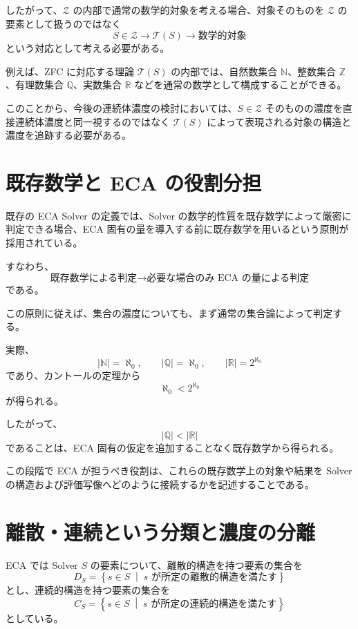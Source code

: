 \documentclass[a4paper,11pt]{article}
\begin{document}
したがって、$\mathcal{Z}$ の内部で通常の数学的対象を考える場合、対象そのものを $\mathcal{Z}$ の要素として扱うのではなく
\[
\boxed{
S\in\mathcal{Z}
\longrightarrow
\mathcal{T}(S)
\longrightarrow
\text{数学的対象}
}
\]
という対応として考える必要がある。

例えば、ZFC に対応する理論 $\mathcal{T}(S)$ の内部では、自然数集合 $\mathbb{N}$、整数集合 $\mathbb{Z}$、有理数集合 $\mathbb{Q}$、実数集合 $\mathbb{R}$ などを通常の数学として構成することができる。

このことから、今後の連続体濃度の検討においては、$S\in\mathcal{Z}$ そのものの濃度を直接連続体濃度と同一視するのではなく $\mathcal{T}(S)$ によって表現される対象の構造と濃度を追跡する必要がある。

\section{既存数学と ECA の役割分担}

既存の ECA Solver の定義では、Solver の数学的性質を既存数学によって厳密に判定できる場合、ECA 固有の量を導入する前に既存数学を用いるという原則が採用されている。

すなわち、
\[
\boxed{
\text{既存数学による判定}
\longrightarrow
\text{必要な場合のみ ECA の量による判定}
}
\]
である。

この原則に従えば、集合の濃度についても、まず通常の集合論によって判定する。

実際、
\[
|\mathbb{N}|=\aleph_0,
\qquad
|\mathbb{Q}|=\aleph_0,
\qquad
|\mathbb{R}|=2^{\aleph_0}
\]
であり、カントールの定理から
\[
\aleph_0<2^{\aleph_0}
\]
が得られる。

したがって、
\[
\boxed{
|\mathbb{Q}|<|\mathbb{R}|
}
\]
であることは、ECA 固有の仮定を追加することなく既存数学から得られる。

この段階で ECA が担うべき役割は、これらの既存数学上の対象や結果を Solver の構造および評価写像へどのように接続するかを記述することである。

\section{離散・連続という分類と濃度の分離}

ECA では Solver $S$ の要素について、離散的構造を持つ要素の集合を
\[
D_S
=
\left\{
s\in S
\;\middle|\;
s\text{ が所定の離散的構造を満たす}
\right\}
\]
とし、連続的構造を持つ要素の集合を
\[
C_S
=
\left\{
s\in S
\;\middle|\;
s\text{ が所定の連続的構造を満たす}
\right\}
\]
としている。
\end{document}
